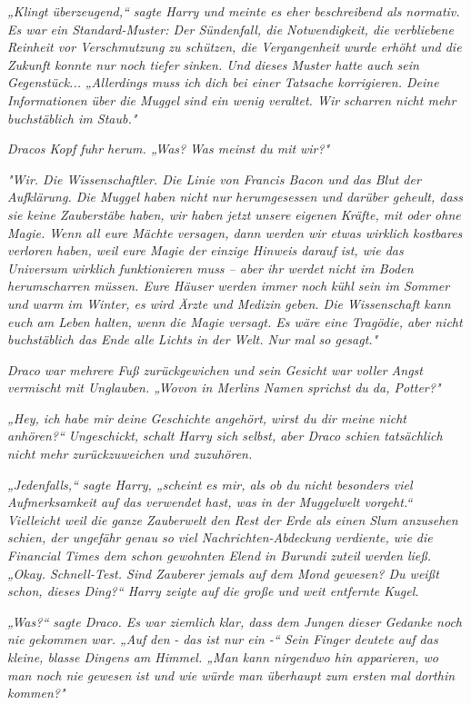 {\emph{„Klingt überzeugend,“ sagte Harry und meinte es eher beschreibend als normativ. Es war ein Standard-Muster: Der Sündenfall, die Notwendigkeit, die verbliebene Reinheit vor Verschmutzung zu schützen, die Vergangenheit wurde erhöht und die Zukunft konnte nur noch tiefer} \emph{sinken. Und dieses Muster hatte auch sein} \emph{\emph{Gegenstück...}} \emph{„Allerdings muss ich dich bei einer Tatsache korrigieren. Deine Informationen über die Muggel sind ein wenig veraltet. Wir scharren nicht mehr buchstäblich im Staub."}

\emph{Dracos Kopf fuhr herum. „\emph{Was?}} \emph{Was meinst du mit} \emph{\emph{wir?}"}

\emph{"Wir. Die Wissenschaftler. Die Linie von Francis Bacon und das Blut der Aufklärung. Die Muggel haben nicht nur herumgesessen und darüber geheult, dass sie keine Zauberstäbe haben, wir haben jetzt unsere} \emph{\emph{eigenen}} \emph{Kräfte, mit oder ohne Magie. Wenn all eure Mächte versagen, dann werden wir etwas wirklich kostbares verloren haben, weil eure Magie der einzige Hinweis darauf ist, wie das Universum} \emph{\emph{wirklich}} \emph{funktionieren muss -- aber ihr werdet nicht im Boden herumscharren müssen. Eure Häuser werden immer noch kühl sein im Sommer und warm im Winter, es wird Ärzte und Medizin geben. Die Wissenschaft kann euch am Leben halten, wenn die Magie versagt. Es wäre eine Tragödie, aber nicht buchstäblich das Ende alle Lichts in der Welt. Nur mal so gesagt."}

\emph{Draco war mehrere Fuß zurückgewichen und sein Gesicht war voller Angst vermischt mit Unglauben. „\emph{Wovon in Merlins Namen sprichst du da, Potter?}"}

\emph{„Hey, ich habe mir} \emph{\emph{deine}} \emph{Geschichte angehört, wirst du dir meine nicht anhören?“} \emph{\emph{Ungeschickt,}} \emph{schalt Harry sich selbst, aber Draco schien tatsächlich nicht mehr zurückzuweichen und zuzuhören.}

\emph{„Jedenfalls,“ sagte Harry, „scheint es mir, als ob du nicht besonders viel Aufmerksamkeit auf das verwendet hast, was in der Muggelwelt vorgeht.“ Vielleicht weil die ganze Zauberwelt den Rest der Erde als einen Slum anzusehen schien, der ungefähr genau so viel Nachrichten-Abdeckung verdiente, wie die \emph{Financial Times dem schon gewohnten Elend in Burundi zuteil werden ließ. „Okay. Schnell-Test. Sind Zauberer jemals auf dem Mond gewesen? Du weißt schon, dieses Ding?“ Harry zeigte auf die große und weit entfernte Kugel.}}

\emph{„\emph{Was?}“ sagte Draco. Es war ziemlich klar, dass dem Jungen dieser Gedanke noch nie gekommen war. „Auf} \emph{\emph{den}} \emph{- das ist nur ein -“ Sein Finger deutete auf das kleine, blasse Dingens am Himmel. „Man kann nirgendwo hin apparieren, wo man noch nie} \emph{\emph{gewesen}} \emph{ist und wie würde man überhaupt zum} \emph{\emph{ersten}} \emph{mal dorthin kommen?"}

}
